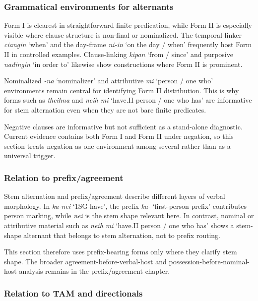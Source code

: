 \documentclass[
  11pt,
  a4paper,
]{article}
\newcommand{\tdim}[1]{\textit{#1}}
\newcommand{\glossquote}[1]{`#1'}
\begin{document}
\subsubsection{Grammatical environments for
alternants}\label{grammatical-environments-for-alternants}

Form I is clearest in straightforward finite predication, while Form II
is especially visible where clause structure is non-final or
nominalized. The temporal linker \tdim{ciangin} \glossquote{when} and
the day-frame \tdim{ni-in} \glossquote{on the day / when} frequently
host Form II in controlled examples. Clause-linking \tdim{kipan}
\glossquote{from / since} and purposive \tdim{nadingin}
\glossquote{in order to} likewise show constructions where Form II is
prominent.

Nominalized \tdim{-na} \glossquote{nominalizer} and attributive
\tdim{mi} \glossquote{person / one who} environments remain central for
identifying Form II distribution. This is why forms such as
\tdim{theihna} and \tdim{neih mi}
\glossquote{have.II person / one who has} are informative for stem
alternation even when they are not bare finite predicates.

Negative clauses are informative but not sufficient as a stand-alone
diagnostic. Current evidence contains both Form I and Form II under
negation, so this section treats negation as one environment among
several rather than as a universal trigger.

\subsubsection{Relation to
prefix/agreement}\label{relation-to-prefixagreement}

Stem alternation and prefix/agreement describe different layers of
verbal morphology. In \tdim{ka-nei} \glossquote{1SG-have}, the prefix
\tdim{ka-} \glossquote{first-person prefix} contributes person marking,
while \tdim{nei} is the stem shape relevant here. In contrast, nominal
or attributive material such as \tdim{neih mi}
\glossquote{have.II person / one who has} shows a stem-shape alternant
that belongs to stem alternation, not to prefix routing.

This section therefore uses prefix-bearing forms only where they clarify
stem shape. The broader agreement-before-verbal-host and
possession-before-nominal-host analysis remains in the prefix/agreement
chapter.

\subsubsection{Relation to TAM and
directionals}\label{relation-to-tam-and-directionals}
\end{document}
